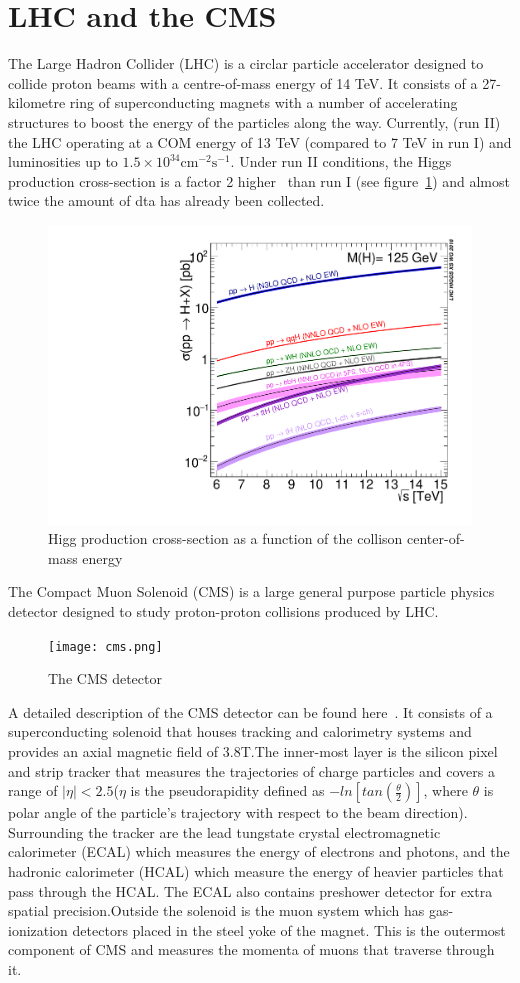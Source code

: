 \documentclass[a4paper,11pt]{article}
\begin{document}
\section{LHC and the CMS}
\label{sec:lhccms} 
The Large Hadron Collider (LHC) is a circlar particle accelerator designed to collide proton beams with a centre-of-mass energy of 14 TeV. It consists of a 27-kilometre ring of superconducting magnets with a number of accelerating structures to boost the energy of the particles along the way. Currently, (run II) the LHC operating at a COM energy of 13 TeV (compared to 7 TeV in run I) and luminosities up to $1.5 \times 10^{34} \mathrm{cm^{-2}s^{-1}}$. Under run II conditions, the Higgs production cross-section is a factor 2 higher~\cite{f} than run I (see figure~\ref{fig:a}) and almost twice the amount of dta has already been collected.     

\begin{figure}[htbp]
\centering
\includegraphics[width=.40\textwidth]{Plot_Escan_H125_new_sqrt.pdf}
\qquad
\caption{\label{fig:a} Higg production cross-section as a function of the collison center-of-mass energy  }
\end{figure}

The Compact Muon Solenoid (CMS) is a large general purpose particle physics  detector  designed to study proton-proton collisions produced by LHC. 
\begin{figure}
  \centering
    \texttt{[image: cms.png]}
  \caption{\label{fig:b} The CMS detector  }
\end{figure}
A detailed description of the CMS detector can be found here~\cite{g}.
It consists of a superconducting solenoid that houses tracking and calorimetry systems and provides an axial magnetic field of 3.8T.The inner-most layer is the silicon pixel and strip tracker that measures the trajectories of charge particles and covers a range of $|\eta|<2.5$($\eta$ is the pseudorapidity defined as $-ln[tan(\frac{\theta}{2})]$, where $\theta$ is polar angle of the particle's trajectory with respect to the beam direction). Surrounding the tracker are the lead tungstate crystal electromagnetic calorimeter (ECAL) which measures the energy of electrons and photons, and the hadronic calorimeter (HCAL) which measure the energy of heavier particles that pass through the HCAL. The ECAL also contains preshower detector for extra spatial precision.Outside the solenoid is the muon system which has gas-ionization detectors placed in the steel yoke of the magnet. This is the outermost component of CMS and measures the momenta of muons that traverse through it.
\end{document}
